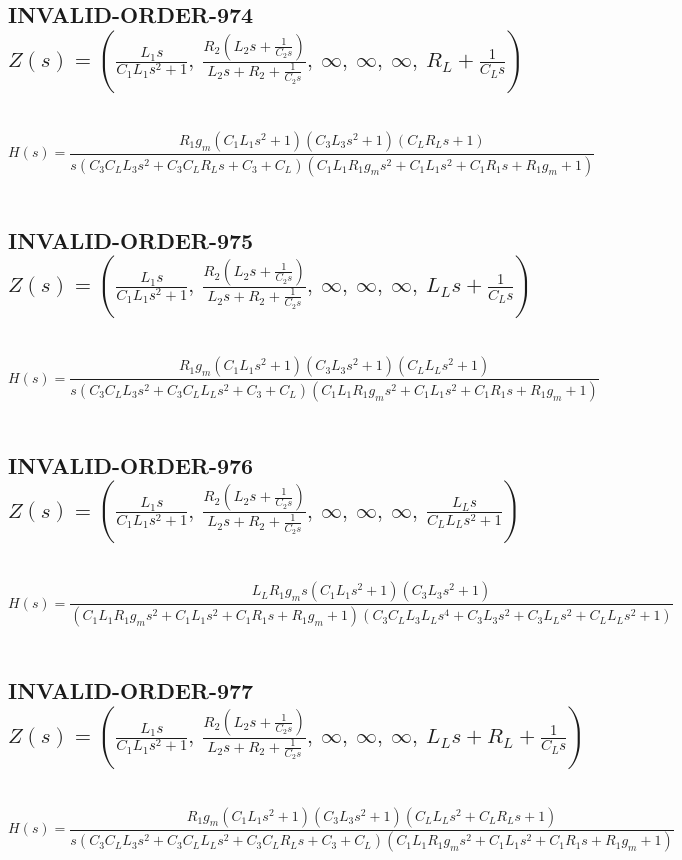 \documentclass{article}
\begin{document}
\subsection{INVALID-ORDER-974 $Z(s) = \left( \frac{L_{1} s}{C_{1} L_{1} s^{2} + 1}, \  \frac{R_{2} \left(L_{2} s + \frac{1}{C_{2} s}\right)}{L_{2} s + R_{2} + \frac{1}{C_{2} s}}, \  \infty, \  \infty, \  \infty, \  R_{L} + \frac{1}{C_{L} s}\right)$ } \ 
\textbf{\[H(s) = \frac{R_{1} g_{m} \left(C_{1} L_{1} s^{2} + 1\right) \left(C_{3} L_{3} s^{2} + 1\right) \left(C_{L} R_{L} s + 1\right)}{s \left(C_{3} C_{L} L_{3} s^{2} + C_{3} C_{L} R_{L} s + C_{3} + C_{L}\right) \left(C_{1} L_{1} R_{1} g_{m} s^{2} + C_{1} L_{1} s^{2} + C_{1} R_{1} s + R_{1} g_{m} + 1\right)}\] } \ 
\subsection{INVALID-ORDER-975 $Z(s) = \left( \frac{L_{1} s}{C_{1} L_{1} s^{2} + 1}, \  \frac{R_{2} \left(L_{2} s + \frac{1}{C_{2} s}\right)}{L_{2} s + R_{2} + \frac{1}{C_{2} s}}, \  \infty, \  \infty, \  \infty, \  L_{L} s + \frac{1}{C_{L} s}\right)$ } \ 
\textbf{\[H(s) = \frac{R_{1} g_{m} \left(C_{1} L_{1} s^{2} + 1\right) \left(C_{3} L_{3} s^{2} + 1\right) \left(C_{L} L_{L} s^{2} + 1\right)}{s \left(C_{3} C_{L} L_{3} s^{2} + C_{3} C_{L} L_{L} s^{2} + C_{3} + C_{L}\right) \left(C_{1} L_{1} R_{1} g_{m} s^{2} + C_{1} L_{1} s^{2} + C_{1} R_{1} s + R_{1} g_{m} + 1\right)}\] } \ 
\subsection{INVALID-ORDER-976 $Z(s) = \left( \frac{L_{1} s}{C_{1} L_{1} s^{2} + 1}, \  \frac{R_{2} \left(L_{2} s + \frac{1}{C_{2} s}\right)}{L_{2} s + R_{2} + \frac{1}{C_{2} s}}, \  \infty, \  \infty, \  \infty, \  \frac{L_{L} s}{C_{L} L_{L} s^{2} + 1}\right)$ } \ 
\textbf{\[H(s) = \frac{L_{L} R_{1} g_{m} s \left(C_{1} L_{1} s^{2} + 1\right) \left(C_{3} L_{3} s^{2} + 1\right)}{\left(C_{1} L_{1} R_{1} g_{m} s^{2} + C_{1} L_{1} s^{2} + C_{1} R_{1} s + R_{1} g_{m} + 1\right) \left(C_{3} C_{L} L_{3} L_{L} s^{4} + C_{3} L_{3} s^{2} + C_{3} L_{L} s^{2} + C_{L} L_{L} s^{2} + 1\right)}\] } \ 
\subsection{INVALID-ORDER-977 $Z(s) = \left( \frac{L_{1} s}{C_{1} L_{1} s^{2} + 1}, \  \frac{R_{2} \left(L_{2} s + \frac{1}{C_{2} s}\right)}{L_{2} s + R_{2} + \frac{1}{C_{2} s}}, \  \infty, \  \infty, \  \infty, \  L_{L} s + R_{L} + \frac{1}{C_{L} s}\right)$ } \ 
\textbf{\[H(s) = \frac{R_{1} g_{m} \left(C_{1} L_{1} s^{2} + 1\right) \left(C_{3} L_{3} s^{2} + 1\right) \left(C_{L} L_{L} s^{2} + C_{L} R_{L} s + 1\right)}{s \left(C_{3} C_{L} L_{3} s^{2} + C_{3} C_{L} L_{L} s^{2} + C_{3} C_{L} R_{L} s + C_{3} + C_{L}\right) \left(C_{1} L_{1} R_{1} g_{m} s^{2} + C_{1} L_{1} s^{2} + C_{1} R_{1} s + R_{1} g_{m} + 1\right)}\] } \ 
\end{document}
